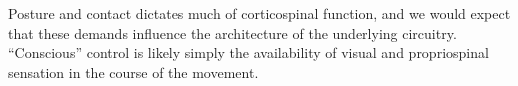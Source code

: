 \documentclass[../main.tex]{subfiles}
\begin{document}
Posture and contact dictates much of corticospinal function, and we would expect that these demands influence the architecture of the underlying circuitry. ``Conscious'' control is likely simply the availability of visual and propriospinal sensation in the course of the movement.





\end{document}
